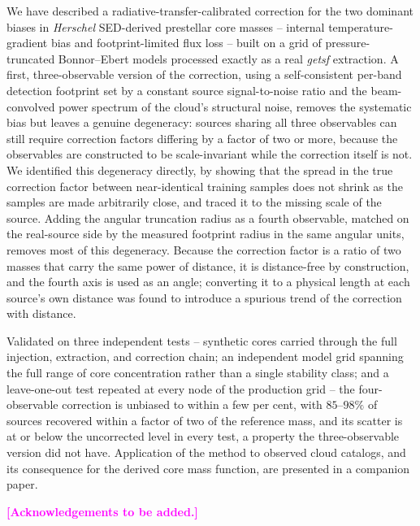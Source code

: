 \documentclass{aa}
\newcommand{\draftnote}[1]{\textcolor{magenta}{\textbf{[#1]}}}
\begin{document}
We have described a radiative-transfer-calibrated correction for the two
dominant biases in \emph{Herschel} SED-derived prestellar core masses -- internal
temperature-gradient bias and footprint-limited flux loss -- built on a
grid of pressure-truncated Bonnor--Ebert models processed exactly as a real
\emph{getsf} extraction. A first, three-observable version of the
correction, using a self-consistent per-band detection footprint set by a
constant source signal-to-noise ratio and the beam-convolved power
spectrum of the cloud's structural noise, removes the systematic bias but
leaves a genuine degeneracy: sources sharing all three observables can
still require correction factors differing by a factor of two or more,
because the observables are constructed to be scale-invariant while the
correction itself is not. We identified this degeneracy directly, by
showing that the spread in the true correction factor between
near-identical training samples does not shrink as the samples are made
arbitrarily close, and traced it to the missing scale of the source.
Adding the angular truncation radius as a fourth observable, matched on the
real-source side by the measured footprint radius in the same angular
units, removes most of this degeneracy. Because the correction factor is a
ratio of two masses that carry the same power of distance, it is
distance-free by construction, and the fourth axis is used as an angle;
converting it to a physical length at each source's own distance was found
to introduce a spurious trend of the correction with distance.

Validated on three independent tests -- synthetic cores carried through
the full injection, extraction, and correction chain; an independent
model grid spanning the full range of core concentration rather than a
single stability class; and a leave-one-out test repeated at every node of
the production grid -- the four-observable correction is unbiased to
within a few per cent, with $85$--$98\%$ of sources recovered within a
factor of two of the reference mass, and its scatter is at or below the
uncorrected level in every test, a property the three-observable version
did not have. Application of the method to observed cloud catalogs, and
its consequence for the derived core mass function, are presented in a
companion paper.

\begin{acknowledgements}
\draftnote{Acknowledgements to be added.}
\end{acknowledgements}



\end{document}
